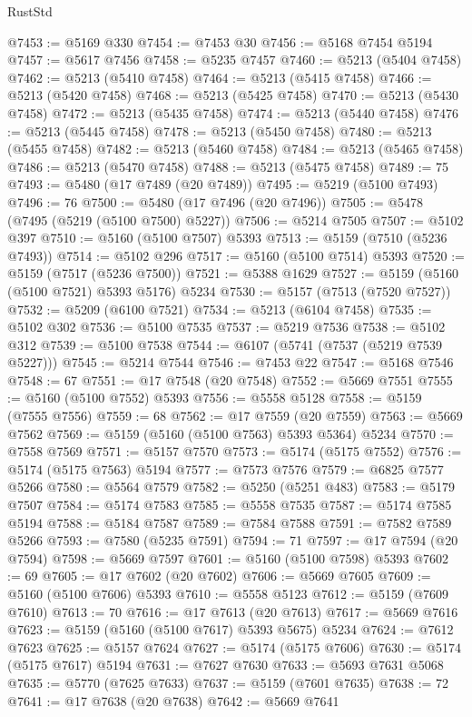 \begin{lexlean}{RustStd}
\begin{coremodule}
@7453 := @5169 @330
@7454 := @7453 @30
@7456 := @5168 @7454 @5194
@7457 := @5617 @7456
@7458 := @5235 @7457
@7460 := @5213 (@5404 @7458)
@7462 := @5213 (@5410 @7458)
@7464 := @5213 (@5415 @7458)
@7466 := @5213 (@5420 @7458)
@7468 := @5213 (@5425 @7458)
@7470 := @5213 (@5430 @7458)
@7472 := @5213 (@5435 @7458)
@7474 := @5213 (@5440 @7458)
@7476 := @5213 (@5445 @7458)
@7478 := @5213 (@5450 @7458)
@7480 := @5213 (@5455 @7458)
@7482 := @5213 (@5460 @7458)
@7484 := @5213 (@5465 @7458)
@7486 := @5213 (@5470 @7458)
@7488 := @5213 (@5475 @7458)
@7489 := 75
@7493 := @5480 (@17 @7489 (@20 @7489))
@7495 := @5219 (@5100 @7493)
@7496 := 76
@7500 := @5480 (@17 @7496 (@20 @7496))
@7505 := @5478 (@7495 (@5219 (@5100 @7500) @5227))
@7506 := @5214 @7505
@7507 := @5102 @397
@7510 := @5160 (@5100 @7507) @5393
@7513 := @5159 (@7510 (@5236 @7493))
@7514 := @5102 @296
@7517 := @5160 (@5100 @7514) @5393
@7520 := @5159 (@7517 (@5236 @7500))
@7521 := @5388 @1629
@7527 := @5159 (@5160 (@5100 @7521) @5393 @5176) @5234
@7530 := @5157 (@7513 (@7520 @7527))
@7532 := @5209 (@6100 @7521)
@7534 := @5213 (@6104 @7458)
@7535 := @5102 @302
@7536 := @5100 @7535
@7537 := @5219 @7536
@7538 := @5102 @312
@7539 := @5100 @7538
@7544 := @6107 (@5741 (@7537 (@5219 @7539 @5227)))
@7545 := @5214 @7544
@7546 := @7453 @22
@7547 := @5168 @7546
@7548 := 67
@7551 := @17 @7548 (@20 @7548)
@7552 := @5669 @7551
@7555 := @5160 (@5100 @7552) @5393
@7556 := @5558 @5128
@7558 := @5159 (@7555 @7556)
@7559 := 68
@7562 := @17 @7559 (@20 @7559)
@7563 := @5669 @7562
@7569 := @5159 (@5160 (@5100 @7563) @5393 @5364) @5234
@7570 := @7558 @7569
@7571 := @5157 @7570
@7573 := @5174 (@5175 @7552)
@7576 := @5174 (@5175 @7563) @5194
@7577 := @7573 @7576
@7579 := @6825 @7577 @5266
@7580 := @5564 @7579
@7582 := @5250 (@5251 @483)
@7583 := @5179 @7507
@7584 := @5174 @7583
@7585 := @5558 @7535
@7587 := @5174 @7585 @5194
@7588 := @5184 @7587
@7589 := @7584 @7588
@7591 := @7582 @7589 @5266
@7593 := @7580 (@5235 @7591)
@7594 := 71
@7597 := @17 @7594 (@20 @7594)
@7598 := @5669 @7597
@7601 := @5160 (@5100 @7598) @5393
@7602 := 69
@7605 := @17 @7602 (@20 @7602)
@7606 := @5669 @7605
@7609 := @5160 (@5100 @7606) @5393
@7610 := @5558 @5123
@7612 := @5159 (@7609 @7610)
@7613 := 70
@7616 := @17 @7613 (@20 @7613)
@7617 := @5669 @7616
@7623 := @5159 (@5160 (@5100 @7617) @5393 @5675) @5234
@7624 := @7612 @7623
@7625 := @5157 @7624
@7627 := @5174 (@5175 @7606)
@7630 := @5174 (@5175 @7617) @5194
@7631 := @7627 @7630
@7633 := @5693 @7631 @5068
@7635 := @5770 (@7625 @7633)
@7637 := @5159 (@7601 @7635)
@7638 := 72
@7641 := @17 @7638 (@20 @7638)
@7642 := @5669 @7641

\end{coremodule}
\end{lexlean}
